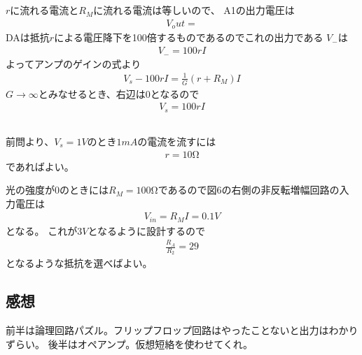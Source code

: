 \documentclass[../../master.tex]{subfiles}
\begin{document}
\subsection{}
\(r\)に流れる電流と\(R_M\)に流れる電流は等しいので、
A1の出力電圧は
\begin{align}
    V_out =
\end{align}
DAは抵抗\(r\)による電圧降下を100倍するものであるのでこれの出力である
\(V_-\)は
\begin{align}
    V_- = 100rI
\end{align}
よってアンプのゲインの式より
\begin{align}
    V_s - 100rI = \frac{1}{G}(r+R_M)I
\end{align}
\(G\to\infty\)とみなせるとき、右辺は0となるので
\begin{align}
    V_s = 100rI
\end{align}

\subsection{}
前問より、\(V_s=1V\)のとき\(1mA\)の電流を流すには
\begin{align}
    r=10\si{\ohm}
\end{align}
であればよい。

光の強度が0のときには\(R_M=100\si{\ohm}\)であるので図6の右側の非反転増幅回路の入力電圧は
\begin{align}
    V_{in} = R_MI = 0.1 V
\end{align}
となる。
これが\(3V\)となるように設計するので
\begin{align}
    \frac{R_A}{R_2} = 29
\end{align}
となるような抵抗を選べばよい。

\subsection*{感想}
前半は論理回路パズル。フリップフロップ回路はやったことないと出力はわかりずらい。
後半はオペアンプ。仮想短絡を使わせてくれ。
\end{document}
